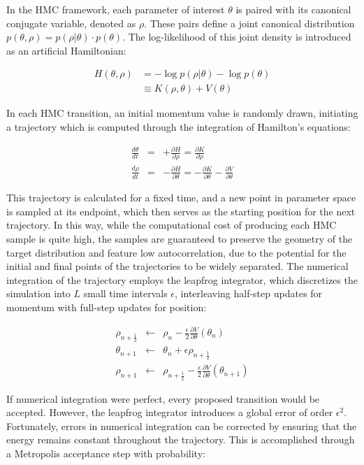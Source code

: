 In the HMC framework, each parameter of interest $\theta$ is paired with its canonical conjugate variable, denoted as $\rho$. These pairs define a joint canonical distribution $p(\theta,\rho) = p(\rho|\theta) \cdot p(\theta)$. The log-likelihood of this joint density is introduced as an artificial Hamiltonian:

\begin{align}
H(\theta,\rho) &= -\log p(\rho|\theta) - \log p(\theta) \\
&\equiv K(\rho,\theta) + V(\theta)
\end{align}

In each HMC transition, an initial momentum value is randomly drawn, initiating a trajectory which is computed through the integration of Hamilton's equations:

\begin{eqnarray}
  \frac{d\theta}{dt}& =& +\frac{\partial H}{\partial \rho} = \frac{\partial K}{\partial \rho} \\
  \frac{d\rho}{dt}& = &-\frac{\partial H}{\partial \theta} = -\frac{\partial K}{\partial \theta} - \frac{\partial V}{\partial \theta}
\end{eqnarray}

This trajectory is calculated for a fixed time, and a new point in parameter space is sampled at its endpoint, which
then serves as the starting position for the next trajectory. In this way, while the computational cost of
producing each HMC sample is quite high, the samples are guaranteed to preserve the geometry of the target distribution and feature low autocorrelation, due to the potential for the initial and final points of the trajectories to be widely separated.  The numerical integration of the trajectory employs the leapfrog integrator, which discretizes the simulation into $L$ small time intervals  $\epsilon$, interleaving half-step updates for momentum with full-step updates for position:

\begin{eqnarray}
\rho_{n+\frac{1}{2}} &\leftarrow &\rho_{n} - \frac{\epsilon}{2} \frac{\partial V}{\partial \theta}(\theta_{n}) \\
\theta_{n+1} &\leftarrow &\theta_n + \epsilon \rho_{n + \frac{1}{2}} \\
\rho_{n+1} &\leftarrow &\rho_{n+\frac{1}{2}} - \frac{\epsilon}{2} \frac{\partial V}{\partial \theta}(\theta_{n+1})
\end{eqnarray}

If numerical integration were perfect, every proposed transition would be accepted. However, the leapfrog integrator introduces a global error of order $\epsilon^2$. Fortunately, errors in numerical integration can be corrected by ensuring that the energy remains constant throughout the trajectory. This is accomplished through a Metropolis acceptance step with probability:


